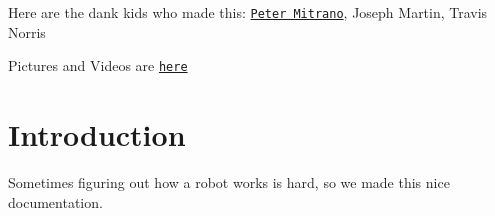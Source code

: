 Here are the dank kids who made this\-:  \href{https://petermitrano.github.io}{\tt Peter Mitrano},  Joseph Martin,  Travis Norris

Pictures and Videos are \href{https://photos.google.com/album/AF1QipMH7TU09SdCnFJVnUSU03R5djZ0XUy_WJTzKOHU}{\tt here}\hypertarget{index_Introduction}{}\section{Introduction}\label{index_Introduction}
Sometimes figuring out how a robot works is hard, so we made this nice documentation. 